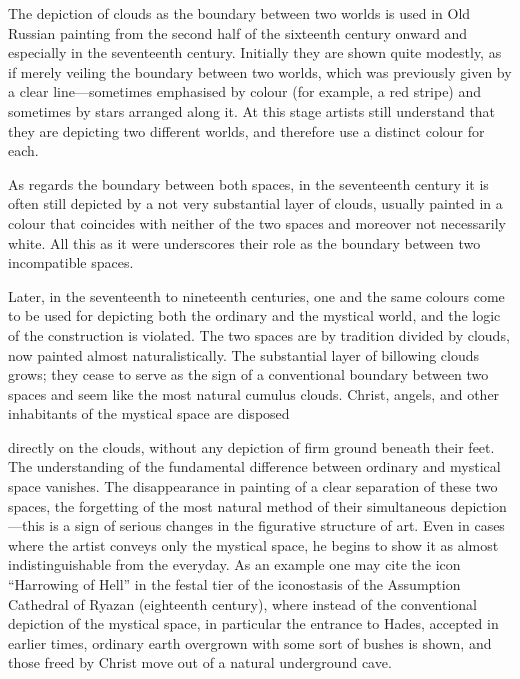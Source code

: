 
The depiction of clouds as the boundary between two worlds is used in Old Russian painting
from the second half of the sixteenth century onward and especially in the seventeenth
century.  Initially they are shown quite modestly, as if merely veiling the boundary
between two worlds, which was previously given by a clear line---sometimes emphasised by
colour (for example, a red stripe) and sometimes by stars arranged along it.  At this
stage artists still understand that they are depicting two different worlds, and therefore
use a distinct colour for each.

As regards the boundary between both spaces, in the seventeenth century it is often still
depicted by a not very substantial layer of clouds, usually painted in a colour that
coincides with neither of the two spaces and moreover not necessarily white.  All this as
it were underscores their role as the boundary between two incompatible spaces.

Later, in the seventeenth to nineteenth centuries, one and the same colours come to be
used for depicting both the ordinary and the mystical world, and the logic of the
construction is violated.  The two spaces are by tradition divided by clouds, now painted
almost naturalistically.  The substantial layer of billowing clouds grows; they cease to
serve as the sign of a conventional boundary between two spaces and seem like the most
natural cumulus clouds.  Christ, angels, and other inhabitants of the mystical space are
disposed



directly on the clouds, without any depiction of firm ground beneath their feet.  The
understanding of the fundamental difference between ordinary and mystical space vanishes.
The disappearance in painting of a clear separation of these two spaces, the forgetting
of the most natural method of their simultaneous depiction---this is a sign of serious
changes in the figurative structure of art.  Even in cases where the artist conveys only
the mystical space, he begins to show it as almost indistinguishable from the everyday.
As an example one may cite the icon ``Harrowing of Hell'' in the festal tier of the
iconostasis of the Assumption Cathedral of Ryazan (eighteenth century), where instead of
the conventional depiction of the mystical space, in particular the entrance to Hades,
accepted in earlier times, ordinary earth overgrown with some sort of bushes is shown,
and those freed by Christ move out of a natural underground cave.

